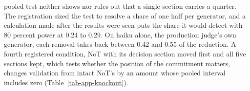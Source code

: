 pooled test neither shows nor rules out that a single section carries a
quarter. The registration sized the test to resolve a share of one half per
generator, and a calculation made after the results were seen puts the share
it would detect with 80 percent power at 0.24 to 0.29. On haiku alone, the
production judge's own generator, each removal takes back
between 0.42 and 0.55 of the reduction. A fourth registered condition, NoT
with its decision section moved first and all five sections kept, which
tests whether the position of the commitment matters, changes
validation from intact NoT's by an amount whose pooled interval includes
zero (Table~\ref{tab-app-knockout}).
